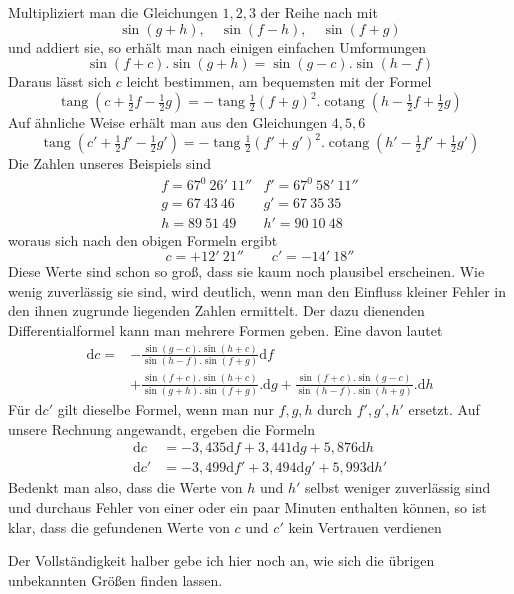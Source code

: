 Multipliziert man die Gleichungen $1,2,3$ der Reihe nach mit
\[
\sin(g+h),\quad\sin(f-h),\quad\sin(f+g)
\]
und addiert sie, so erhält man nach einigen einfachen Umformungen
\[
\sin(f+c).\sin(g+h)=\sin(g-c).\sin(h-f)
\]
Daraus lässt sich $c$ leicht bestimmen, am bequemsten mit der Formel
\[
\operatorname{tang}(c+\tfrac{1}{2}f-\tfrac{1}{2}g)=-\operatorname{tang}\tfrac{1}{2}(f+g)^2.\operatorname{cotang}(h-\tfrac{1}{2}f+\tfrac{1}{2}g)
\]
Auf ähnliche Weise erhält man aus den Gleichungen $4,5,6$
\[
\operatorname{tang}(c'+\tfrac{1}{2}f'-\tfrac{1}{2}g')=-\operatorname{tang}\tfrac{1}{2}(f'+g')^2.\operatorname{cotang}(h'-\tfrac{1}{2}f'+\tfrac{1}{2}g')
\]
Die Zahlen unseres Beispiels sind
\[
\begin{array}{ll}
f=67^0\ 26'\ 11''&f'=67^0\ 58'\ 11''\\
g=67\ 43\ 46&g'=67\ 35\ 35\\
h=89\ 51\ 49&h'=90\ 10\ 48
\end{array}
\]
woraus sich nach den obigen Formeln ergibt
\[
c=+12'\ 21''\qquad c'=-14'\ 18''
\]
Diese Werte sind schon so groß, dass sie kaum noch plausibel erscheinen. Wie wenig zuverlässig sie sind, wird deutlich, wenn man den Einfluss kleiner Fehler in den ihnen zugrunde liegenden Zahlen ermittelt. Der dazu dienenden Differentialformel kann man mehrere Formen geben. Eine davon lautet
\[
\begin{aligned}
\mathrm{d}c={}&-\frac{\sin(g-c).\sin(h+c)}{\sin(h-f).\sin(f+g)}\mathrm{d}f\\
&+\frac{\sin(f+c).\sin(h+c)}{\sin(g+h).\sin(f+g)}.\mathrm{d}g
+\frac{\sin(f+c).\sin(g-c)}{\sin(h-f).\sin(h+g)}.\mathrm{d}h
\end{aligned}
\]
Für $\mathrm{d}c'$ gilt dieselbe Formel, wenn man nur $f,g,h$ durch $f',g',h'$ ersetzt. Auf unsere Rechnung angewandt, ergeben die Formeln
\[
\begin{aligned}
\mathrm{d}c&=-3{,}435\mathrm{d}f+3{,}441\mathrm{d}g+5{,}876\mathrm{d}h\\
\mathrm{d}c'&=-3{,}499\mathrm{d}f'+3{,}494\mathrm{d}g'+5{,}993\mathrm{d}h'
\end{aligned}
\]
Bedenkt man also, dass die Werte von $h$ und $h'$ selbst weniger zuverlässig sind und durchaus Fehler von einer oder ein paar Minuten enthalten können, so ist klar, dass die gefundenen Werte von $c$ und $c'$ kein Vertrauen verdienen

Der Vollständigkeit halber gebe ich hier noch an, wie sich die übrigen unbekannten Größen finden lassen.

